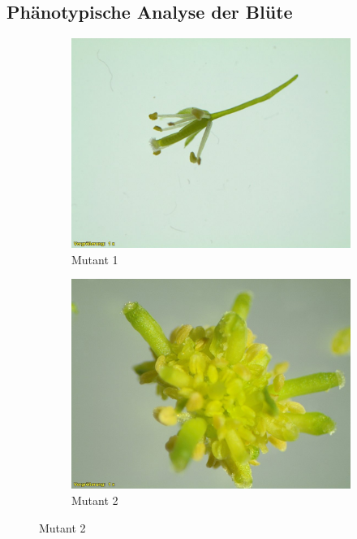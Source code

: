 \documentclass[10pt,a4paper]{article}
\begin{document}
		
	\subsection{Phänotypische Analyse der Blüte}
	
		\begin{figure}[H]
			\centering
			\begin{subfigure}[b]{0.45\textwidth}
				\includegraphics[width=\textwidth]{1_O+A.jpg}
				\caption{Mutant 1}
				\label{fig:M1}
			\end{subfigure}
			\hfill
			\begin{subfigure}[b]{0.45\textwidth}
				\includegraphics[width=\textwidth]{2_O+A(1).jpg}
				\caption{Mutant 2}
				\label{fig:M2}

\end{subfigure}
\end{figure}
\end{document}
